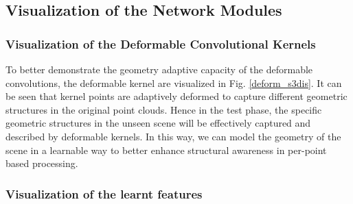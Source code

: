 \documentclass[journal]{IEEEtran}
\begin{document}
 







\subsection{Visualization of the Network Modules}
\subsubsection{Visualization of the Deformable Convolutional Kernels}

To better demonstrate the geometry adaptive capacity of the deformable convolutions, the deformable kernel are visualized in  Fig. \ref{deform_s3dis}. It can be seen that kernel points are adaptively deformed to capture different geometric structures in the original point clouds. Hence in the test phase, the specific geometric structures in the unseen scene will be effectively captured and described by deformable kernels. In this way, we can model the geometry of the scene in a learnable way to better enhance structural awareness in per-point based processing.
\subsubsection{Visualization of the learnt features}
\end{document}
